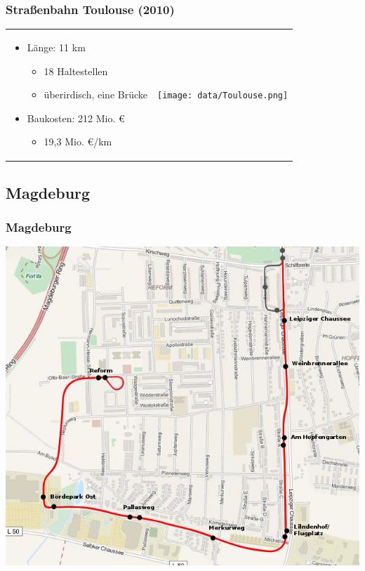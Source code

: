 \documentclass[xcolor=dvipsnames]{beamer}
\begin{document}

\begin{frame}
  \frametitle{Straßenbahn Toulouse (2010)}

  \begin{tabular}{lc}
    \begin{minipage}{.5\linewidth}
      \begin{itemize}
      \item Länge: 11 km
        \begin{itemize}
        \item 18 Haltestellen
        \item überirdisch, eine Brücke
        \end{itemize}
      \item Baukosten: 212 Mio. €
        \begin{itemize}
        \item 19,3 Mio. €/km
        \end{itemize}
      \end{itemize}
    \end{minipage}
    &
    \begin{minipage}{.5\linewidth}
      \texttt{[image: data/Toulouse.png]}
    \end{minipage}
  \end{tabular}
\end{frame}


\subsection{Magdeburg}
\begin{frame}
  \frametitle{Magdeburg}

  \begin{center}
    \includegraphics[height=.8\textheight]{data/Magdeburg.png}
  \end{center}
\end{frame}
\end{document}
